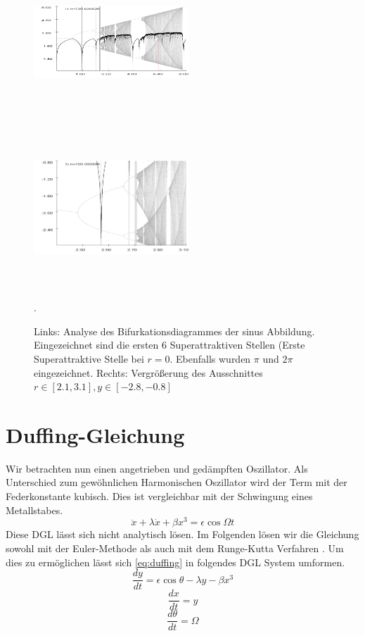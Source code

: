 \documentclass[11,5pt, twoside]{article}
\begin{document}
\begin{figure}[!htbp]
\centering
\includegraphics[height=230px, width= 220px]{bifurkation-sin}
\includegraphics[height= 230px, width= 220px]{bifurkation-sin-zoom}
\caption{Links: Analyse des Bifurkationsdiagrammes der sinus Abbildung. Eingezeichnet sind die ersten 6 Superattraktiven Stellen (Erste Superattraktive Stelle bei $r=0$. Ebenfalls wurden $\pi$ und $2\pi$ eingezeichnet. Rechts: Vergrößerung des Ausschnittes $r \in [2.1,3.1], y\in[-2.8,-0.8]$}. 
\label{fig:bifurc-sin}
\end{figure}
\newpage
\section { Duffing-Gleichung}
Wir betrachten nun einen angetrieben und gedämpften Oszillator. Als Unterschied zum gewöhnlichen Harmonischen Oszillator wird der Term mit der Federkonstante kubisch. Dies ist vergleichbar mit der Schwingung eines Metallstabes.
\begin{equation}
\ddot{x}+\lambda\dot{x}+\beta x^3=\epsilon\cos{\Omega t}
\label{eq:duffing}
\end{equation} 
Diese DGL lässt sich nicht analytisch lösen.
Im Folgenden lösen wir die Gleichung sowohl mit der Euler-Methode \parencite{wiki:euler} als auch mit dem Runge-Kutta Verfahren \parencite{wiki:runge}. Um dies zu ermöglichen lässt sich \eqref{eq:duffing} in folgendes DGL System umformen.
\begin{equation}\frac{dy}{dt}=\epsilon\cos{\theta}-\lambda y - \beta x^3\end{equation}
\begin{equation}\frac{dx}{dt}=y\end{equation}
\begin{equation}\frac{d\theta}{dt}=\Omega\end{equation}
\newline
\end{document}
